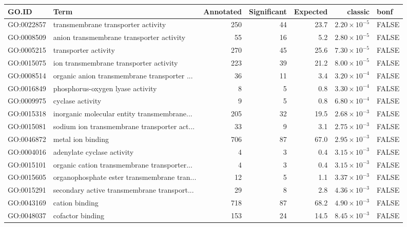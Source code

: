 \begin{table}[ht]
\centering
\begin{adjustbox}{max width=\textwidth}
\begin{tabular}{llrrrrl}
  \hline
GO.ID & Term & Annotated & Significant & Expected & classic & bonf \\ 
  \hline
GO:0022857 & transmembrane transporter activity & 250 & 44 & 23.7 & $2.20 \times 10^{-5}$ & FALSE \\ 
  GO:0008509 & anion transmembrane transporter activity & 55 & 16 & 5.2 & $2.80 \times 10^{-5}$ & FALSE \\ 
  GO:0005215 & transporter activity & 270 & 45 & 25.6 & $7.30 \times 10^{-5}$ & FALSE \\ 
  GO:0015075 & ion transmembrane transporter activity & 223 & 39 & 21.2 & $8.00 \times 10^{-5}$ & FALSE \\ 
  GO:0008514 & organic anion transmembrane transporter ... & 36 & 11 & 3.4 & $3.20 \times 10^{-4}$ & FALSE \\ 
  GO:0016849 & phosphorus-oxygen lyase activity & 8 & 5 & 0.8 & $3.30 \times 10^{-4}$ & FALSE \\ 
  GO:0009975 & cyclase activity & 9 & 5 & 0.8 & $6.80 \times 10^{-4}$ & FALSE \\ 
  GO:0015318 & inorganic molecular entity transmembrane... & 205 & 32 & 19.5 & $2.68 \times 10^{-3}$ & FALSE \\ 
  GO:0015081 & sodium ion transmembrane transporter act... & 33 & 9 & 3.1 & $2.75 \times 10^{-3}$ & FALSE \\ 
  GO:0046872 & metal ion binding & 706 & 87 & 67.0 & $2.95 \times 10^{-3}$ & FALSE \\ 
  GO:0004016 & adenylate cyclase activity & 4 & 3 & 0.4 & $3.15 \times 10^{-3}$ & FALSE \\ 
  GO:0015101 & organic cation transmembrane transporter... & 4 & 3 & 0.4 & $3.15 \times 10^{-3}$ & FALSE \\ 
  GO:0015605 & organophosphate ester transmembrane tran... & 12 & 5 & 1.1 & $3.37 \times 10^{-3}$ & FALSE \\ 
  GO:0015291 & secondary active transmembrane transport... & 29 & 8 & 2.8 & $4.36 \times 10^{-3}$ & FALSE \\ 
  GO:0043169 & cation binding & 718 & 87 & 68.2 & $4.90 \times 10^{-3}$ & FALSE \\ 
  GO:0048037 & cofactor binding & 153 & 24 & 14.5 & $8.45 \times 10^{-3}$ & FALSE \\ 

\end{tabular}
\end{adjustbox}
\end{table}
